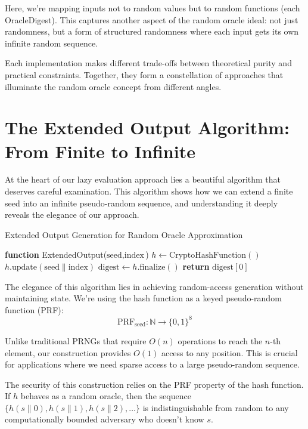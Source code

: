 \documentclass[11pt]{article}
\begin{document}
Here, we're mapping inputs not to random values but to random functions (each OracleDigest). This captures another aspect of the random oracle ideal: not just randomness, but a form of structured randomness where each input gets its own infinite random sequence.

Each implementation makes different trade-offs between theoretical purity and practical constraints. Together, they form a constellation of approaches that illuminate the random oracle concept from different angles.

\section{The Extended Output Algorithm: From Finite to Infinite}

At the heart of our lazy evaluation approach lies a beautiful algorithm that deserves careful examination. This algorithm shows how we can extend a finite seed into an infinite pseudo-random sequence, and understanding it deeply reveals the elegance of our approach.

\begin{algorithm}
\caption{Extended Output Generation for Random Oracle Approximation}
\begin{algorithmic}
\STATE \textbf{function} ExtendedOutput($\text{seed}, \text{index}$)
\STATE \quad $h \gets \text{CryptoHashFunction}()$
\STATE \quad $h.\text{update}(\text{seed} \| \text{index})$
\STATE \quad $\text{digest} \gets h.\text{finalize}()$
\STATE \quad \textbf{return} $\text{digest}[0]$
\end{algorithmic}
\end{algorithm}

The elegance of this algorithm lies in achieving random-access generation without maintaining state. We're using the hash function as a keyed pseudo-random function (PRF):
$$\text{PRF}_{\text{seed}}: \mathbb{N} \to \{0,1\}^8$$

Unlike traditional PRNGs that require $O(n)$ operations to reach the $n$-th element, our construction provides $O(1)$ access to any position. This is crucial for applications where we need sparse access to a large pseudo-random sequence.

The security of this construction relies on the PRF property of the hash function. If $h$ behaves as a random oracle, then the sequence $\{h(s \| 0), h(s \| 1), h(s \| 2), \ldots\}$ is indistinguishable from random to any computationally bounded adversary who doesn't know $s$.
\end{document}
